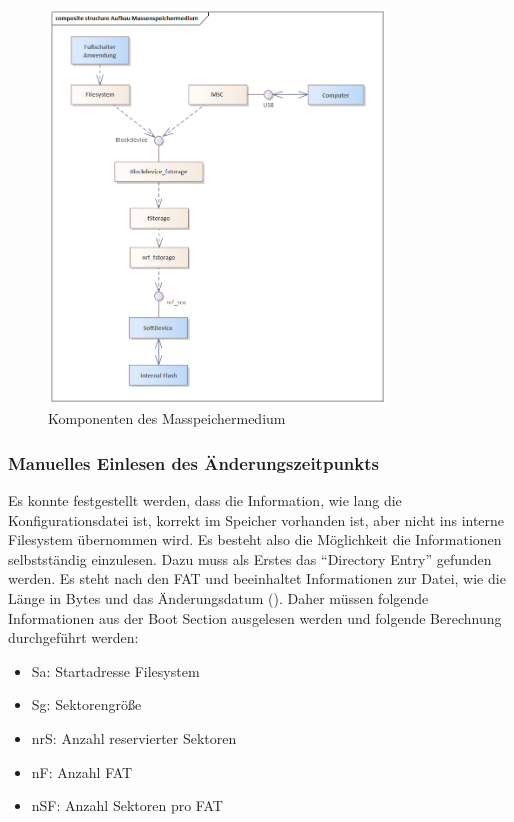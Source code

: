 \begin{figure}[H] 
	\centering
	\includegraphics[width=0.8\textwidth]{figures/Aufbau_Massenspeichermedium.png}
	\caption{Komponenten des Masspeichermedium}
	\label{fig:KomponentenMasspeichermedium}
\end{figure}

\subsubsection{Manuelles Einlesen des Änderungszeitpunkts}
Es konnte festgestellt werden, dass die Information, wie lang die Konfigurationsdatei ist, korrekt im Speicher vorhanden ist, aber nicht ins interne Filesystem übernommen wird. Es besteht also die Möglichkeit die Informationen selbstständig einzulesen. Dazu muss als Erstes das ``Directory Entry'' gefunden werden. Es steht nach den \ac{FAT} und beeinhaltet Informationen zur Datei, wie die Länge in Bytes und das Änderungsdatum (\cite[Abschnitt 1.4]{FAT}). Daher müssen folgende Informationen aus der Boot Section ausgelesen werden und folgende Berechnung durchgeführt werden:
\begin{itemize}
    \item Sa: Startadresse Filesystem
    \item Sg: Sektorengröße
    \item nrS: Anzahl reservierter Sektoren
    \item nF: Anzahl \ac{FAT}
    \item nSF: Anzahl Sektoren pro \ac{FAT}
\end{itemize}

